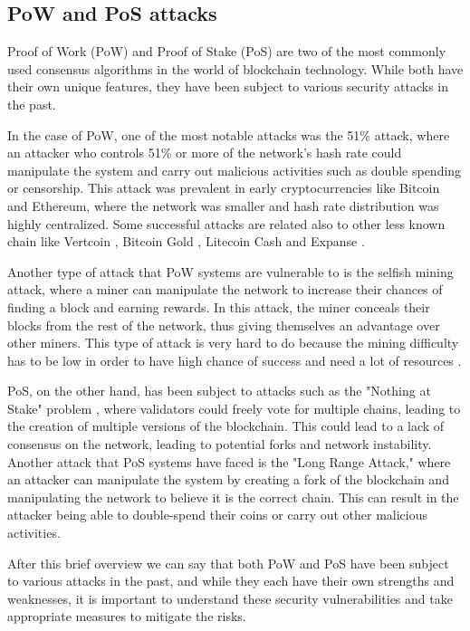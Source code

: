 \documentclass[target=mst,aauheader=]{thud}
\begin{document}
    \subsection{PoW and PoS attacks}

    Proof of Work (PoW) and Proof of Stake (PoS) are two of the most commonly used consensus algorithms in the world of blockchain technology. While both have their own unique features, they have been subject to various security attacks in the past.\par

    In the case of PoW, one of the most notable attacks was the 51\% attack, where an attacker who controls 51\% or more of the network's hash rate could manipulate the system and carry out malicious activities such as double spending or censorship. This attack was prevalent in early cryptocurrencies like Bitcoin and Ethereum, where the network was smaller and hash rate distribution was highly centralized. Some successful attacks are related also to other less known chain like Vertcoin \cite{VTC51Attack}, Bitcoin Gold \cite{BTCG51Attack}, Litecoin Cash \cite{LCC51Attack} and Expanse \cite{EXP51Attack}.\par
    Another type of attack that PoW systems are vulnerable to is the selfish mining attack, where a miner can manipulate the network to increase their chances of finding a block and earning rewards. In this attack, the miner conceals their blocks from the rest of the network, thus giving themselves an advantage over other miners. This type of attack is very hard to do because the mining difficulty has to be low in order to have high chance of success and need a lot of resources \cite{SelfishMiningDefinition}.\par
    PoS, on the other hand, has been subject to attacks such as the "Nothing at Stake" problem \cite{NothingAtStake}, where validators could freely vote for multiple chains, leading to the creation of multiple versions of the blockchain. This could lead to a lack of consensus on the network, leading to potential forks and network instability.
    Another attack that PoS systems have faced is the "Long Range Attack," \cite{LongRangeAttack} where an attacker can manipulate the system by creating a fork of the blockchain and manipulating the network to believe it is the correct chain. This can result in the attacker being able to double-spend their coins or carry out other malicious activities.

    After this brief overview we can say that both PoW and PoS have been subject to various attacks in the past, and while they each have their own strengths and weaknesses, it is important to understand these security vulnerabilities and take appropriate measures to mitigate the risks.
\end{document}
